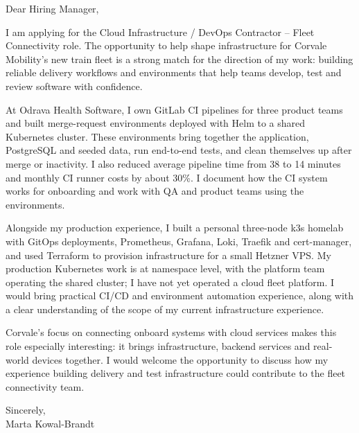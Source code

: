 \documentclass[11pt,a4paper]{article}
\begin{document}
Dear Hiring Manager,

I am applying for the Cloud Infrastructure / DevOps Contractor – Fleet Connectivity role. The opportunity to help shape infrastructure for Corvale Mobility’s new train fleet is a strong match for the direction of my work: building reliable delivery workflows and environments that help teams develop, test and review software with confidence.

At Odrava Health Software, I own GitLab CI pipelines for three product teams and built merge-request environments deployed with Helm to a shared Kubernetes cluster. These environments bring together the application, PostgreSQL and seeded data, run end-to-end tests, and clean themselves up after merge or inactivity. I also reduced average pipeline time from 38 to 14 minutes and monthly CI runner costs by about 30\%. I document how the CI system works for onboarding and work with QA and product teams using the environments.

Alongside my production experience, I built a personal three-node k3s homelab with GitOps deployments, Prometheus, Grafana, Loki, Traefik and cert-manager, and used Terraform to provision infrastructure for a small Hetzner VPS. My production Kubernetes work is at namespace level, with the platform team operating the shared cluster; I have not yet operated a cloud fleet platform. I would bring practical CI/CD and environment automation experience, along with a clear understanding of the scope of my current infrastructure experience.

Corvale’s focus on connecting onboard systems with cloud services makes this role especially interesting: it brings infrastructure, backend services and real-world devices together. I would welcome the opportunity to discuss how my experience building delivery and test infrastructure could contribute to the fleet connectivity team.

Sincerely,\\
Marta Kowal-Brandt
\end{document}
